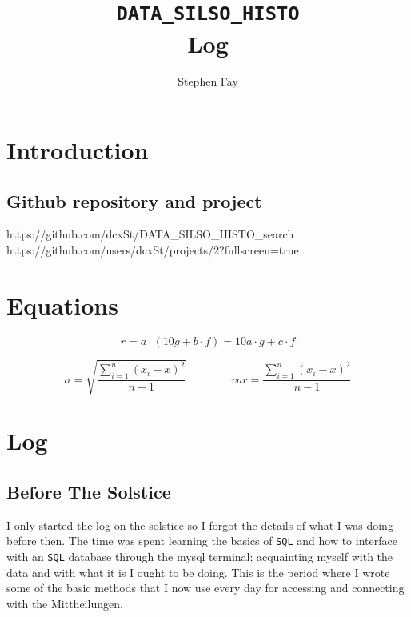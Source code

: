 \documentclass[12pt]{article}
\renewcommand\qedsymbol{$\Smiley$}
\begin{document}
 
 
\title{\texttt{DATA\_SILSO\_HISTO}\\Log}
\author{Stephen Fay}
\maketitle

\tableofcontents

\section{Introduction}
\subsection{Github repository and project}
    https://github.com/dcxSt/DATA\_SILSO\_HISTO\_search \\
    https://github.com/users/dcxSt/projects/2?fullscreen=true

\section{Equations}

\begin{equation}\label{derivde equation}
    r = a\cdot(10 g + b\cdot f) = 10 a\cdot g + c\cdot f
\end{equation}

\begin{equation}\label{standard deviation equation}
    \sigma = \sqrt{\frac{\sum_{i=1}^{n} (x_i - \bar{x})^2}{n-1}}  \quad \quad \quad \quad 
    var = \frac{\sum_{i=1}^{n} (x_i - \bar{x})^2}{n-1}
\end{equation}

\section{Log}

\subsection{Before The Solstice}
I only started the log on the solstice so I forgot the details of what I was doing before then. The time was spent learning the basics of \texttt{SQL} and how to interface with an \texttt{SQL} database through the mysql terminal; acquainting myself with the data and with what it is I ought to be doing. This is the period where I wrote some of the basic methods that I now use every day for accessing and connecting with the Mittheilungen.
\end{document}

